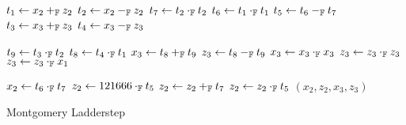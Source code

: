 

\begin{algorithm}[h]
\label{evaluation:ladder-step:montgomery}
\begin{algorithmic}[1]
\begin{multicols}{3}
\State $t_1 \leftarrow x_2 +_{\mathbb{F}} z_2$
\State $t_2 \leftarrow x_2 -_{\mathbb{F}} z_2$
\State $t_7 \leftarrow t_2 \cdot_{\mathbb{F}} t_2$
\State $t_6 \leftarrow t_1 \cdot_{\mathbb{F}} t_1$
\State $t_5 \leftarrow t_6 -_{\mathbb{F}} t_7$
\State $t_3 \leftarrow x_3 +_{\mathbb{F}} z_3$
\State $t_4 \leftarrow x_3 -_{\mathbb{F}} z_3$\rule{0ex}{0ex}
\State $t_9 \leftarrow t_3 \cdot_{\mathbb{F}} t_2$
\State $t_8 \leftarrow t_4 \cdot_{\mathbb{F}} t_1$
\State $x_3 \leftarrow t_8 +_{\mathbb{F}} t_9$
\State $z_3 \leftarrow t_8 -_{\mathbb{F}} t_9$
\State $x_3 \leftarrow x_3 \cdot_{\mathbb{F}} x_3$
\State $z_3 \leftarrow z_3 \cdot_{\mathbb{F}} z_3$
\State $z_3 \leftarrow z_3 \cdot_{\mathbb{F}} x_1$\rule{0ex}{0ex} 
\State $x_2 \leftarrow t_6 \cdot_{\mathbb{F}} t_7$
\State $z_2 \leftarrow  121666 \cdot_{\mathbb{F}} t_5$
\State $z_2 \leftarrow z_2 +_{\mathbb{F}} t_7$
\State $z_2 \leftarrow z_2 \cdot_{\mathbb{F}} t_5$
\State \Return $(x_2, z_2, x_3, z_3)$
\EndFunction
\end{multicols}
\end{algorithmic}
\caption{Montgomery Ladderstep}
\end{algorithm}

 
